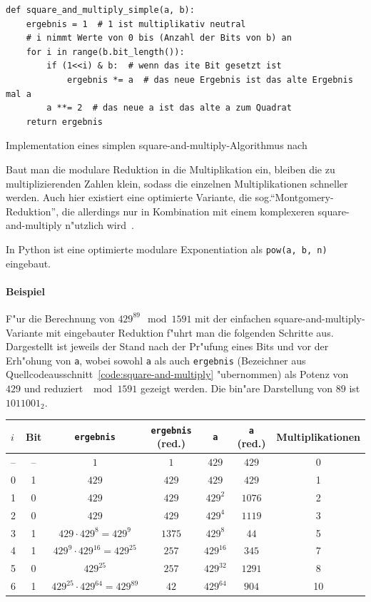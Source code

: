 \documentclass[12pt]{article}
\begin{document}
\begin{code-snip}
\begin{lstlisting}
def square_and_multiply_simple(a, b):
    ergebnis = 1  # 1 ist multiplikativ neutral
    # i nimmt Werte von 0 bis (Anzahl der Bits von b) an
    for i in range(b.bit_length()):
        if (1<<i) & b:  # wenn das ite Bit gesetzt ist
            ergebnis *= a  # das neue Ergebnis ist das alte Ergebnis mal a
        a **= 2  # das neue a ist das alte a zum Quadrat
    return ergebnis
\end{lstlisting}
\caption{Implementation eines simplen square-and-multiply-Algorithmus nach~\cite{hac}}
\label{code:square-and-multiply}
\end{code-snip}

Baut man die modulare Reduktion in die Multiplikation ein,
bleiben die zu multiplizierenden Zahlen klein, sodass die einzelnen
Multiplikationen schneller werden.
Auch hier existiert eine optimierte Variante, die sog.\@ "`Montgomery-Reduktion"',
die allerdings nur in Kombination mit einem komplexeren square-and-multiply n"utzlich wird~\cite{hac}.

In Python ist eine optimierte modulare Exponentiation als \lstinline{pow(a, b, n)} eingebaut.

\paragraph{Beispiel}
F"ur die Berechnung von $429^{89} \mod 1591$ mit der einfachen square-and-multiply-Variante
mit eingebauter Reduktion f"uhrt man die folgenden Schritte aus.
Dargestellt ist jeweils der Stand nach der Pr"ufung eines Bits und vor der Erh"ohung von \texttt{a},
wobei sowohl \texttt{a} als auch \texttt{ergebnis} (Bezeichner aus Quellcodeausschnitt~\ref{code:square-and-multiply} "ubernommen)
als Potenz von $429$ und reduziert $\mod 1591$ gezeigt werden.
Die bin"are Darstellung von $89$ ist $1011001_2$. \\

\begin{tabular}{l|c c c c c c}
    $i$ & Bit & \texttt{ergebnis} & \texttt{ergebnis} (red.\@) & \texttt{a} & \texttt{a} (red.\@) & Multiplikationen\\
    \hline
    \hline
    -- & -- & $1$ & $1$ & $429$ & $429$ & 0 \\
    \hline
    0 & 1 & $429$ & $429$ & $429$ & $429$ & 1 \\
    1 & 0 & $429$ & $429$ & $429^2$ & $1076$ & 2 \\
    2 & 0 & $429$ & $429$ & $429^4$ & $1119$ & 3 \\
    3 & 1 & $429 \cdot 429^8 = 429^9$ & $1375$ & $429^8$ & $44$ & 5 \\
    4 & 1 & $429^9 \cdot 429^{16} = 429^{25}$ & $257$ & $429^{16}$ & $345$ & 7 \\
    5 & 0 & $429^{25}$ & $257$ & $429^{32}$ & $1291$ & 8 \\
    6 & 1 & $429^{25} \cdot 429^{64} = 429^{89}$ & $42$ & $429^{64}$ & $904$ & 10 \\
\end{tabular}
\end{document}
